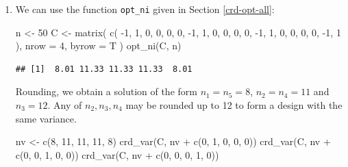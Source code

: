 \documentclass[
]{book}
\newenvironment{Shaded}{\begin{snugshade}}{\end{snugshade}}
\newcommand{\AttributeTok}[1]{\textcolor[rgb]{0.77,0.63,0.00}{#1}}
\newcommand{\DecValTok}[1]{\textcolor[rgb]{0.00,0.00,0.81}{#1}}
\newcommand{\FunctionTok}[1]{\textcolor[rgb]{0.00,0.00,0.00}{#1}}
\newcommand{\NormalTok}[1]{#1}
\newcommand{\OtherTok}[1]{\textcolor[rgb]{0.56,0.35,0.01}{#1}}
\newcommand{\SpecialCharTok}[1]{\textcolor[rgb]{0.00,0.00,0.00}{#1}}
\theoremstyle{definition}
\theoremstyle{definition}
\theoremstyle{definition}
\theoremstyle{definition}
\theoremstyle{remark}
\begin{document}
\begin{enumerate}
\def\labelenumi{\alph{enumi}.}
\item
  We can use the function \texttt{opt\_ni} given in Section \ref{crd-opt-all}:

\begin{Shaded}
\begin{Highlighting}[]
\NormalTok{n }\OtherTok{\textless{}{-}} \DecValTok{50}
\NormalTok{C }\OtherTok{\textless{}{-}} \FunctionTok{matrix}\NormalTok{(}
  \FunctionTok{c}\NormalTok{(}
  \SpecialCharTok{{-}}\DecValTok{1}\NormalTok{, }\DecValTok{1}\NormalTok{, }\DecValTok{0}\NormalTok{, }\DecValTok{0}\NormalTok{, }\DecValTok{0}\NormalTok{,}
  \DecValTok{0}\NormalTok{, }\SpecialCharTok{{-}}\DecValTok{1}\NormalTok{, }\DecValTok{1}\NormalTok{, }\DecValTok{0}\NormalTok{, }\DecValTok{0}\NormalTok{,}
  \DecValTok{0}\NormalTok{, }\DecValTok{0}\NormalTok{, }\SpecialCharTok{{-}}\DecValTok{1}\NormalTok{, }\DecValTok{1}\NormalTok{, }\DecValTok{0}\NormalTok{,}
  \DecValTok{0}\NormalTok{, }\DecValTok{0}\NormalTok{, }\DecValTok{0}\NormalTok{, }\SpecialCharTok{{-}}\DecValTok{1}\NormalTok{, }\DecValTok{1}
\NormalTok{  ), }\AttributeTok{nrow =} \DecValTok{4}\NormalTok{, }\AttributeTok{byrow =}\NormalTok{ T}
\NormalTok{)}
\FunctionTok{opt\_ni}\NormalTok{(C, n) }
\end{Highlighting}
\end{Shaded}

\begin{verbatim}
## [1]  8.01 11.33 11.33 11.33  8.01
\end{verbatim}

  Rounding, we obtain a solution of the form \(n_1 = n_5 =8\), \(n_2 = n_4 = 11\) and \(n_3 = 12\). Any of \(n_2, n_3, n_4\) may be rounded up to 12 to form a design with the same variance.

\begin{Shaded}
\begin{Highlighting}[]
\NormalTok{nv }\OtherTok{\textless{}{-}} \FunctionTok{c}\NormalTok{(}\DecValTok{8}\NormalTok{, }\DecValTok{11}\NormalTok{, }\DecValTok{11}\NormalTok{, }\DecValTok{11}\NormalTok{, }\DecValTok{8}\NormalTok{)}
\FunctionTok{crd\_var}\NormalTok{(C, nv }\SpecialCharTok{+} \FunctionTok{c}\NormalTok{(}\DecValTok{0}\NormalTok{, }\DecValTok{1}\NormalTok{, }\DecValTok{0}\NormalTok{, }\DecValTok{0}\NormalTok{, }\DecValTok{0}\NormalTok{))}
\FunctionTok{crd\_var}\NormalTok{(C, nv }\SpecialCharTok{+} \FunctionTok{c}\NormalTok{(}\DecValTok{0}\NormalTok{, }\DecValTok{0}\NormalTok{, }\DecValTok{1}\NormalTok{, }\DecValTok{0}\NormalTok{, }\DecValTok{0}\NormalTok{))}
\FunctionTok{crd\_var}\NormalTok{(C, nv }\SpecialCharTok{+} \FunctionTok{c}\NormalTok{(}\DecValTok{0}\NormalTok{, }\DecValTok{0}\NormalTok{, }\DecValTok{0}\NormalTok{, }\DecValTok{1}\NormalTok{, }\DecValTok{0}\NormalTok{))}
\end{Highlighting}
\end{Shaded}


\end{enumerate}
\end{document}
